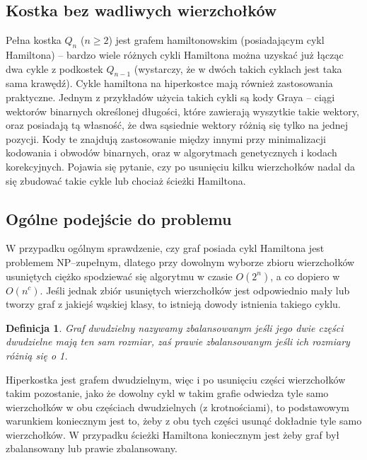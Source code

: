 \documentclass{pracamgr}
\newtheorem{defi}{Definicja}[section] %
\begin{document}
   \subsection{Kostka bez wadliwych wierzchołków}
    Pełna kostka $Q_n$ ($n\ge2$) jest grafem hamiltonowskim (posiadającym cykl Hamiltona)
    -- bardzo wiele różnych cykli Hamiltona można uzyskać już łącząc dwa cykle
    z podkostek $Q_{n-1}$ (wystarczy, że w dwóch takich cyklach jest taka sama krawędź).
    Cykle hamiltona na hiperkostce mają również zastosowania praktyczne. Jednym z przykładów użycia takich cykli są kody Graya
    -- ciągi wektorów binarnych określonej długości, które zawierają wyszytkie takie wektory, oraz posiadają tą własność,
    że dwa sąsiednie wektory różnią się tylko na jednej pozycji. Kody te znajdują zastosowanie między innymi przy minimalizacji kodowania i obwodów binarnych,
    oraz w algorytmach genetycznych i kodach korekcyjnych.\newline
    Pojawia się pytanie, czy po usunięciu kilku wierzchołków nadal da się zbudować takie cykle lub chociaż ścieżki Hamiltona.
   \subsection{Ogólne podejście do problemu}
    W przypadku ogólnym sprawdzenie, czy graf posiada cykl Hamiltona jest problemem NP--zupełnym, dlatego przy dowolnym wyborze zbioru wierzchołków usuniętych
    ciężko spodziewać się algorytmu w czasie $O(2^n)$, a co dopiero w $O(n^c)$. Jeśli jednak zbiór usuniętych wierzchołków
    jest odpowiednio mały lub tworzy graf z jakiejś wąskiej klasy, to istnieją dowody istnienia takiego cyklu.
    
    \begin{defi}\label{graf zbalansowany}
     Graf dwudzielny nazywamy \emph{zbalansowanym} jeśli jego dwie części dwudzielne mają ten sam rozmiar,
     zaś \emph{prawie zbalansowanym} jeśli ich rozmiary różnią się o 1.
    \end{defi}    
    
    Hiperkostka jest grafem dwudzielnym, więc i po usunięciu części wierzchołków takim pozostanie,
    jako że dowolny cykl w takim grafie odwiedza tyle samo wierzchołków w obu częściach dwudzielnych (z krotnościami),
    to podstawowym warunkiem koniecznym jest to, żeby z obu tych części usunąć dokładnie tyle samo wierzchołków.
    W przypadku ścieżki Hamiltona koniecznym jest żeby graf był zbalansowany lub prawie zbalansowany.
    
\end{document}
